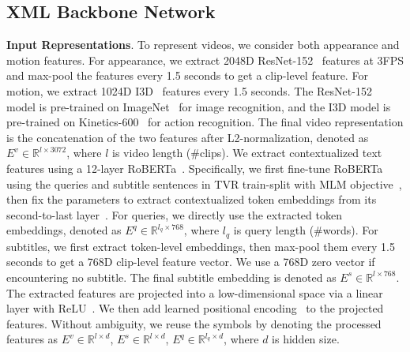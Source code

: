 \documentclass[runningheads]{llncs}
\begin{document}
\subsection{XML Backbone Network}\label{subsec:xml_backbone}
\noindent\textbf{Input Representations}. To represent videos, we consider both appearance and motion features. For appearance, we extract 2048D ResNet-152~\cite{he2016deep} features at 3FPS and max-pool the features every 1.5 seconds to get a clip-level feature. 
For motion, we extract 1024D I3D~\cite{carreira2017quo} features every 1.5 seconds. 
The ResNet-152 model is pre-trained on ImageNet~\cite{deng2009imagenet} for image recognition, and the I3D model is pre-trained on Kinetics-600~\cite{kay2017kinetics} for action recognition. 
The final video representation is the concatenation of the two features after L2-normalization, denoted as $E^{v} \in \mathbb{R}^{l \times 3072}$, where $l$ is video length (\#clips).
We extract contextualized text features using a 12-layer RoBERTa~\cite{liu2019roberta}. 
Specifically, we first fine-tune RoBERTa using the queries and subtitle sentences in TVR train-split with MLM objective~\cite{devlin2018bert}, then fix the parameters to extract contextualized token embeddings from its second-to-last layer~\cite{lei2019tvqa+}. 
For queries, we directly use the extracted token embeddings, denoted as $E^{q} \in \mathbb{R}^{l_q \times 768}$, where $l_q$ is query length (\#words). 
For subtitles, we first extract token-level embeddings, then max-pool them every 1.5 seconds to get a 768D clip-level feature vector. 
We use a 768D zero vector if encountering no subtitle.
The final subtitle embedding is denoted as $E^{s} \in \mathbb{R}^{l \times 768}$.
The extracted features are projected into a low-dimensional space via a linear layer with ReLU~\cite{glorot2011deep}. 
We then add learned positional encoding~\cite{devlin2018bert} to the projected features. 
Without ambiguity, we reuse the symbols by denoting the processed features as $E^{v} \in \mathbb{R}^{l \times d}$, $E^{s} \in \mathbb{R}^{l \times d}$, $E^{q} \in \mathbb{R}^{l_q \times d}$, where $d$ is hidden size.
\end{document}
